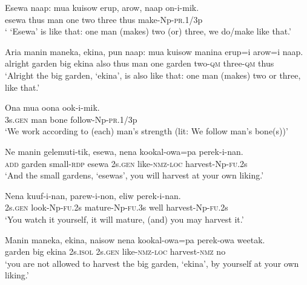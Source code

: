 \ea\label{ex:a:x13}
\gll  Esewa  naap:  mua  kuisow  erup,  arow,  naap  on-i-mik. \\
esewa  thus  man  one  two  three  thus  make-Np-\textsc{pr}.1/3p \\
\glt ‘ ‘Esewa’ is like that: one man (makes) two (or) three, we do/make like that.’ \\
\z


\ea\label{ex:a:x14}
\gll  Aria  manin  maneka,  ekina,  pun  naap:  mua  kuisow  manina  erup=i arow=i  naap. \\
alright  garden  big  ekina  also  thus  man  one  garden  two-\textsc{qm}           three-\textsc{qm}  thus \\


\glt ‘Alright the big garden, ‘ekina’, is also like that: one man (makes) two or three, like that.’ \\
\z


\ea\label{ex:a:x15}
\gll  Ona  mua  oona  ook-i-mik. \\
3s.\textsc{gen}  man  bone  follow-Np-\textsc{pr}.1/3p \\
\glt ‘We work according to (each) man’s strength (lit: We follow man’s bone(s))’ \\
\z


\ea\label{ex:a:x16}
\gll  Ne  manin  gelemuti-tik,  esewa,  nena  kookal-owa=pa  perek-i-nan. \\
\textsc{add}  garden  small-\textsc{rdp}  esewa  2s.\textsc{gen}  like-\textsc{nmz}-\textsc{loc}  harvest-Np-\textsc{fu}.2s \\
\glt ‘And the small gardens, ‘esewas’, you will harvest at your own liking.’ \\
\z


\ea\label{ex:a:x17}
\gll  Nena  kuuf-i-nan,  parew-i-non,  eliw  perek-i-nan. \\
2s.\textsc{gen}  look-Np-\textsc{fu}.2s  mature-Np-\textsc{fu}.3s  well  harvest-Np-\textsc{fu}.2s \\
\glt ‘You watch it yourself, it will mature, (and) you may harvest it.’ \\
\z


\ea\label{ex:a:x18}
\gll  Manin  maneka,  ekina,  naisow  nena  kookal-owa=pa  perek-owa{\footnotemark}   weetak. \\
garden  big  ekina  2s.\textsc{isol}  2s.\textsc{gen}  like-\textsc{nmz}-\textsc{loc}  harvest-\textsc{nmz}  no \\
\glt ‘you are not allowed to harvest the big garden, ‘ekina’, by yourself at  your own liking.’ \\
\z

